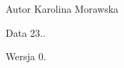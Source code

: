 \begin{DoxyAuthor}{Autor}
Karolina Morawska 
\end{DoxyAuthor}
\begin{DoxyDate}{Data}
23.. 
\end{DoxyDate}
\begin{DoxyVersion}{Wersja}
0. 
\end{DoxyVersion}

